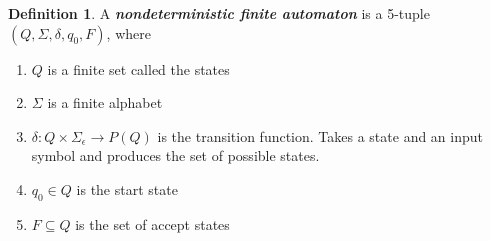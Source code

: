 \documentclass[11pt]{article}
\theoremstyle{definition}
\newtheorem{defn}{Definition}[section]
\begin{document}
\begin{defn}
A \textbf{\textit{nondeterministic finite automaton}} is a 5-tuple $(Q,\Sigma, \delta, q_0, F)$, where
\begin{enumerate}
    \item $Q$ is a finite set called the states 
    \item $\Sigma$ is a finite alphabet
    \item $\delta: Q\times\Sigma_\epsilon \longrightarrow P(Q)$ is the transition function. Takes a state and an input symbol and produces the set of possible states.
    \item $q_0 \in Q$ is the start state
    \item $F\subseteq Q$ is the set of accept states
\end{enumerate}
\end{defn}
\end{document}
